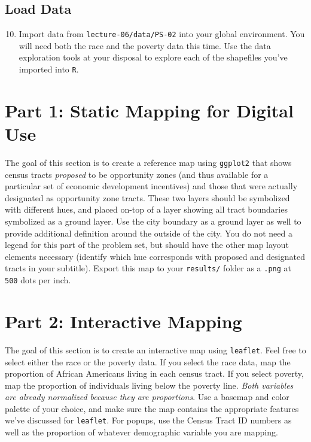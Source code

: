 \documentclass{tufte-handout}
\begin{document}
\vspace{3mm}
\subsection{Load Data}
\begin{enumerate}[label=\alph*.]
\setcounter{enumi}{9}
\item Import data from \texttt{lecture-06/data/PS-02} into your global environment. You will need both the race and the poverty data this time. Use the data exploration tools at your disposal to explore each of the shapefiles you've imported into \texttt{R}.
\end{enumerate}

\vspace{5mm}
\section{Part 1: Static Mapping for Digital Use}
The goal of this section is to create a reference map using \texttt{ggplot2} that shows census tracts \textit{proposed} to be opportunity zones (and thus available for a particular set of economic development incentives) and those that were actually designated as opportunity zone tracts. These two layers should be symbolized with different hues, and placed on-top of a layer showing all tract boundaries symbolized as a ground layer. Use the city boundary as a ground layer as well to provide additional definition around the outside of the city. You do not need a legend for this part of the problem set, but should have the other map layout elements necessary (identify which hue corresponds with proposed and designated tracts in your subtitle). Export this map to your \texttt{results/} folder as a \texttt{.png} at \texttt{500} dots per inch.

\vspace{5mm}
\section{Part 2: Interactive Mapping}
The goal of this section is to create an interactive map using \texttt{leaflet}. Feel free to select either the race or the poverty data. If you select the race data, map the proportion of African Americans living in each census tract. If you select poverty, map the proportion of individuals living below the poverty line. \textit{Both variables are already normalized because they are proportions}. Use a basemap and color palette of your choice, and make sure the map contains the appropriate features we've discussed for \texttt{leaflet}. For popups, use the Census Tract ID numbers as well as the proportion of whatever demographic variable you are mapping.
\end{document}
